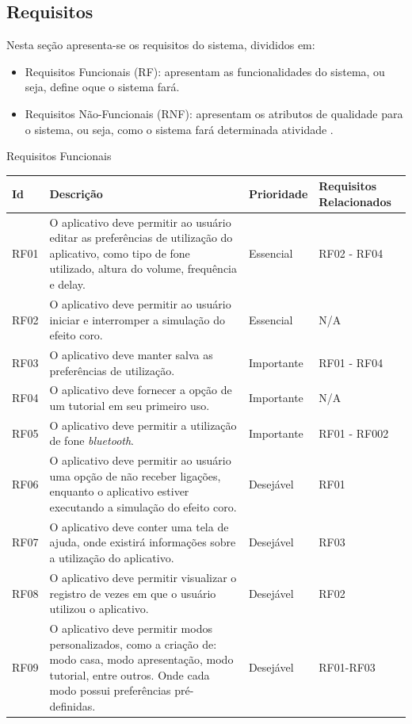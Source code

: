 \subsection{Requisitos}

Nesta se\c{c}\~ao apresenta-se os requisitos do sistema, divididos em:
\begin{itemize}
	
	\item  Requisitos Funcionais (RF): apresentam as funcionalidades do sistema, ou seja, define oque o sistema far\'a. 
	
	\item Requisitos N\~ao-Funcionais (RNF): apresentam os atributos de qualidade para o sistema, ou seja, como o sistema far\'a determinada atividade \cite{Ventura2016}. 
	
\end{itemize}

\begin{quadro}[H]
	\caption{Requisitos Funcionais}\label{quad:reqfuncionais}
	\centering
	\begin{tabular}{|p{1.0cm}|p{8.0cm}|p{2.0cm}|p{2.5cm}|}
		\hline
		\textbf{Id} & \textbf{Descri\c{c}\~ao} & \textbf{Prioridade} & \textbf{Requisitos Relacionados}\\
		\hline
		RF01 & O aplicativo deve permitir ao usu\'ario editar as prefer\^encias de utiliza\c{c}\~ao do aplicativo, como tipo de fone utilizado, altura do volume, frequ\^encia e delay. & Essencial & RF02 - RF04\\
		\hline
		RF02 & O aplicativo deve permitir ao usu\'ario iniciar e interromper a simula\c{c}\~ao do efeito coro. & Essencial & N/A \\
		\hline
		RF03 & O aplicativo deve manter salva as prefer\^encias de utiliza\c{c}\~ao. & Importante & RF01 - RF04\\
		\hline
		RF04 & O aplicativo deve fornecer a op\c{c}\~ao de um tutorial em seu primeiro uso. & Importante & N/A\\
		\hline
		RF05 & O aplicativo deve permitir a utiliza\c{c}\~ao de fone \textit{bluetooth}. & Importante & RF01 - RF002\\
		\hline
		RF06 & O aplicativo deve permitir ao usu\'ario uma op\c{c}\~ao de n\~ao receber liga\c{c}\~oes, enquanto o aplicativo estiver executando a simula\c{c}\~ao do efeito coro. & Desej\'avel & RF01\\
		\hline
		RF07 & O aplicativo deve conter uma tela de ajuda, onde existir\'a informa\c{c}\~oes sobre a utiliza\c{c}\~ao do aplicativo. & Desej\'avel & RF03\\
		\hline
		RF08 & O aplicativo deve permitir visualizar o registro de vezes em que o usu\'ario utilizou o aplicativo. & Desej\'avel & RF02\\
		\hline
		RF09 & O aplicativo deve permitir modos personalizados, como a cria\c{c}\~ao de: modo casa, modo apresenta\c{c}\~ao, modo tutorial, entre outros. Onde cada modo possui prefer\^encias pr\'e-definidas. & Desej\'avel & RF01-RF03\\
		\hline	
	\end{tabular}	
\end{quadro}


